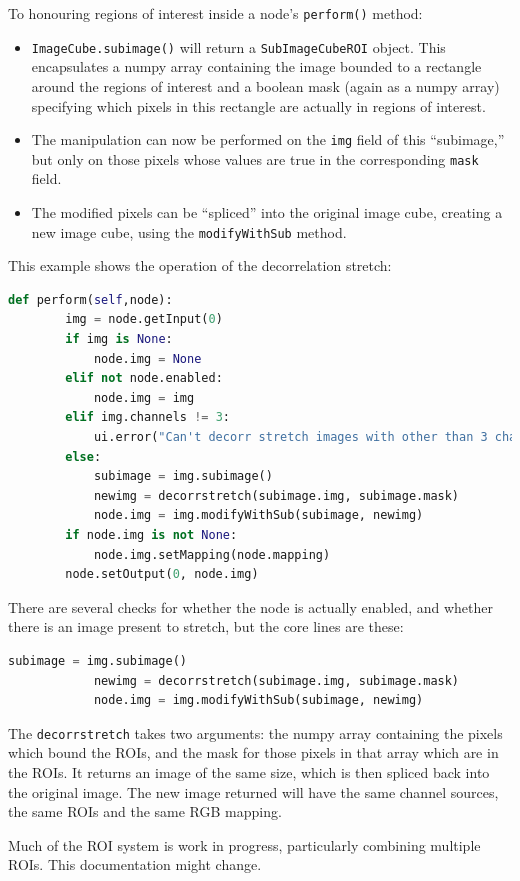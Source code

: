 To honouring regions of interest inside a node's \texttt{perform()} method:
\begin{itemize}
\item \texttt{ImageCube.subimage()} will return a \texttt{SubImageCubeROI} object. This encapsulates
a numpy array containing the image bounded to a rectangle around the regions of interest and
a boolean mask (again as a numpy array) specifying which pixels in this rectangle are actually
in regions of interest.
\item The manipulation can now be performed on the \texttt{img} field of this ``subimage,'' but
only on those pixels whose values are true in the corresponding \texttt{mask} field.
\item The modified pixels can be ``spliced'' into the original image cube, creating a new image
cube, using the \texttt{modifyWithSub} method.
\end{itemize}
This example shows the operation of the decorrelation stretch:
\begin{lstlisting}[language=Python]
    def perform(self,node):
        img = node.getInput(0)
        if img is None:
            node.img = None
        elif not node.enabled:
            node.img = img
        elif img.channels != 3:
            ui.error("Can't decorr stretch images with other than 3 channels")
        else:
            subimage = img.subimage()
            newimg = decorrstretch(subimage.img, subimage.mask)
            node.img = img.modifyWithSub(subimage, newimg)
        if node.img is not None:
            node.img.setMapping(node.mapping)
        node.setOutput(0, node.img)
\end{lstlisting}
There are several checks for whether the node is actually enabled, and whether there is an image
present to stretch, but the core lines are these:
\begin{lstlisting}[language=Python]
            subimage = img.subimage()
            newimg = decorrstretch(subimage.img, subimage.mask)
            node.img = img.modifyWithSub(subimage, newimg)
\end{lstlisting}
The \texttt{decorrstretch} takes two arguments: the numpy array containing the pixels which bound
the ROIs, and the mask for those pixels in that array which are in the ROIs. It returns an image
of the same size, which is then spliced back into the original image. The new image returned
will have the same channel sources, the same ROIs and the same RGB mapping.

\begin{notebox}
Much of the ROI system is work in progress, particularly combining
multiple ROIs. This documentation might change.
\end{notebox}


